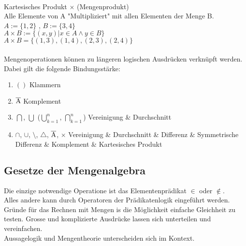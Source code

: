 \documentclass[../gruppenarbeit_1.tex]{subfiles}
\begin{document}
\\

Kartesisches Produkt $\times$ (Mengenprodukt)\\
Alle Elemente von A "Multipliziert" mit allen Elementen der Menge B.\\
$A := \{1,2\}$ , $B := \{3,4\}$\\
$A \times B := \{(x,y) | x \in A \wedge y \in B\}$\\
$A \times B = \{(1,3),(1,4),(2,3),(2,4)\}$\\
\\

Mengenoperationen können zu längeren logischen Ausdrücken verknüpft werden.\\

Dabei gilt die folgende Bindungsstärke:

\begin{enumerate}
  \item $( )$ \hspace{15.5mm} Klammern
  \item $\overline{\rm A}$ \hspace{8mm} Komplement
  \item $\bigcap$, $\bigcup$ ($\bigcup \limits_{k=1}^n$, $\bigcap \limits_{k=1}^n$) \hspace{1mm} Vereinigung \& Durchschnitt
  \item $\cap$, $\cup$, $\setminus$, $\triangle$, $\overline{\rm A}$, $\times$ \hspace{8mm} Vereinigung \& Durchschnitt \& Differenz \& Symmetrische Differenz \& Komplement \& Kartesisches Produkt
\end{enumerate}


\subsection{Gesetze der Mengenalgebra}

Die einzige notwendige Operatione ist das Elementenprädikat $\in$ oder $\notin$.\\
Alles andere kann durch Operatoren der Prädikatenlogik eingeführt werden.\\
Gründe für das Rechnen mit Mengen is die Möglichkeit einfache Gleichheit zu testen. Grosse und komplizierte Ausdrücke lassen sich unterteilen und vereinfachen.\\
Aussagelogik und Mengentheorie unterscheiden sich im Kontext.\\
\\
\end{document}

